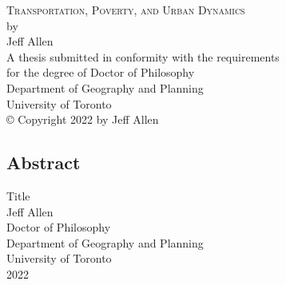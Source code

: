 \documentclass[11 pt, letterpaper]{report}
\begin{document}
	
{\begin{titlepage}
		\large
		\singlespacing
		\begin{center}
			\mbox{}
			\vfill
			\textsc{Transportation, Poverty, and Urban Dynamics}\\
			\vfill
			by \\
			\vfill
			{Jeff Allen}\\
			\vfill
			\vfill
			A thesis submitted in conformity with the requirements \\
			for the degree of Doctor of Philosophy  \\
			Department of Geography and Planning \\
			University of Toronto \\
			\vfill
			{\copyright} Copyright 2022 by Jeff Allen\\
			\vspace{.01\textheight}
			\mbox{}
		\end{center}
		\setcounter{page}{1}
	\end{titlepage}
	\setcounter{page}{2}}






\renewcommand{\thepage}{\roman{page}}%

\newpage



\begin{center}
\section*{Abstract}
	\singlespacing
	{Title}\\[2ex]
	{Jeff Allen}\\
	{Doctor of Philosophy}\\
	Department of Geography and Planning\\
	University of Toronto\\
	{2022}\\
\end{center}
\end{document}
